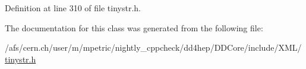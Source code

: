 Definition at line 310 of file tinystr.\+h.



The documentation for this class was generated from the following file\+:\begin{DoxyCompactItemize}
\item 
/afs/cern.\+ch/user/m/mpetric/nightly\+\_\+cppcheck/dd4hep/\+D\+D\+Core/include/\+X\+M\+L/\hyperlink{tinystr_8h}{tinystr.\+h}\end{DoxyCompactItemize}
